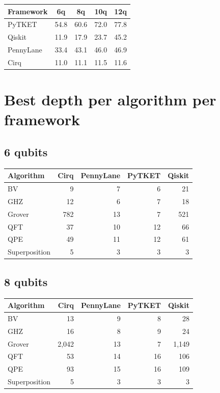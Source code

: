 \documentclass[11pt,a4paper]{article}
\begin{document}
\begin{table}[H]
\centering
\begin{tabular}{lcccc}
\toprule
Framework & 6q & 8q & 10q & 12q \\
\midrule
PyTKET    & 54.8 & 60.6 & 72.0 & 77.8 \\
Qiskit    & 11.9 & 17.9 & 23.7 & 45.2 \\
PennyLane & 33.4 & 43.1 & 46.0 & 46.9 \\
Cirq      & 11.0 & 11.1 & 11.5 & 11.6 \\
\bottomrule
\end{tabular}
\end{table}

\section{Best depth per algorithm per framework}

\subsection{6 qubits}

\begin{table}[H]
\centering
\begin{tabular}{lrrrr}
\toprule
Algorithm & Cirq & PennyLane & PyTKET & Qiskit \\
\midrule
BV            & 9   & 7  & 6  & 21 \\
GHZ           & 12  & 6  & 7  & 18 \\
Grover        & 782 & 13 & 7  & 521 \\
QFT           & 37  & 10 & 12 & 66 \\
QPE           & 49  & 11 & 12 & 61 \\
Superposition & 5   & 3  & 3  & 3 \\
\bottomrule
\end{tabular}
\end{table}

\subsection{8 qubits}

\begin{table}[H]
\centering
\begin{tabular}{lrrrr}
\toprule
Algorithm & Cirq & PennyLane & PyTKET & Qiskit \\
\midrule
BV            & 13    & 9  & 8  & 28 \\
GHZ           & 16    & 8  & 9  & 24 \\
Grover        & 2{,}042 & 13 & 7  & 1{,}149 \\
QFT           & 53    & 14 & 16 & 106 \\
QPE           & 93    & 15 & 16 & 109 \\
Superposition & 5     & 3  & 3  & 3 \\
\bottomrule
\end{tabular}
\end{table}
\end{document}
